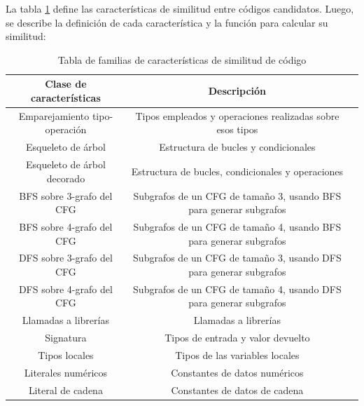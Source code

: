 La tabla \ref{table:search-similarity} define las características de similitud entre códigos candidatos. Luego, se describe la definición de cada característica y la función para calcular su similitud:

\begin{table}[h]
\centering
\begin{threeparttable}[b]
\caption{Tabla de familias de características de similitud de código}
\label{table:search-similarity}
\begin{tabular}{ccc} \toprule
    {Clase de características} & {Descripción} \\ \midrule
Emparejamiento tipo-operación & Tipos empleados y operaciones realizadas sobre esos tipos \\
Esqueleto de árbol & Estructura de bucles y condicionales \\
Esqueleto de árbol decorado & Estructura de bucles, condicionales y operaciones \\
BFS sobre 3-grafo del CFG & Subgrafos de un CFG de tamaño 3, usando BFS para generar subgrafos \\
BFS sobre 4-grafo del CFG & Subgrafos de un CFG de tamaño 4, usando BFS para generar subgrafos \\
DFS sobre 3-grafo del CFG & Subgrafos de un CFG de tamaño 3, usando DFS para generar subgrafos \\
DFS sobre 4-grafo del CFG & Subgrafos de un CFG de tamaño 4, usando DFS para generar subgrafos \\
Llamadas a librerías & Llamadas a librerías \\
Signatura & Tipos de entrada y valor devuelto \\
Tipos locales & Tipos de las variables locales \\
Literales numéricos & Constantes de datos numéricos \\
Literal de cadena & Constantes de datos de cadena \\
\bottomrule
\end{tabular}
\end{threeparttable}
\end{table}

